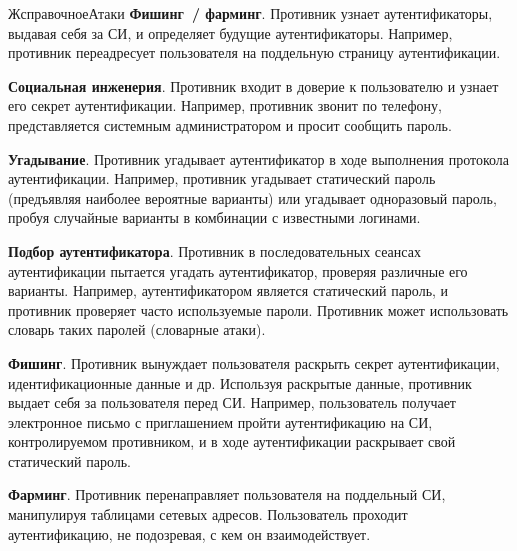 \begin{appendix}{Ж}{справочное}{Атаки}
{\bf Фишинг~/ фарминг}. 
Противник узнает аутентификаторы, выдавая себя за СИ, и определяет будущие 
аутентификаторы.
%
Например, противник переадресует пользователя на поддельную страницу 
аутентификации.


{\bf Социальная инженерия}. 
Противник входит в доверие к пользователю и узнает его секрет аутентификации.
%
Например, противник звонит по телефону, представляется системным администратором 
и просит сообщить пароль.


{\bf Угадывание}. 
Противник угадывает аутентификатор в ходе выполнения протокола аутентификации.
%
Например, противник угадывает статический пароль (предъявляя наиболее
вероятные варианты) или угадывает одноразовый пароль, пробуя случайные
варианты в комбинации с известными логинами.


\label{ATK.AP}

{\bf Подбор аутентификатора}. 
Противник в последовательных сеансах аутентификации пытается 
угадать аутентификатор, проверяя различные его варианты. 
Например, аутентификатором является статический пароль, 
и противник проверяет часто используемые пароли. 
Противник может использовать словарь таких паролей (словарные атаки).


{\bf Фишинг}. 
Противник вынуждает пользователя раскрыть секрет аутентификации, 
идентификационные данные и др. Используя раскрытые данные, противник 
выдает себя за пользователя перед СИ. Например, пользователь  
получает электронное письмо с приглашением пройти аутентификацию на 
СИ, контролируемом противником, и в ходе аутентификации раскрывает 
свой статический пароль. 

{\bf Фарминг}. 
Противник перенаправляет пользователя на поддельный СИ,
манипулируя таблицами сетевых адресов.
Пользователь проходит аутентификацию, не подозревая,
с кем он взаимодействует.


\end{appendix}
